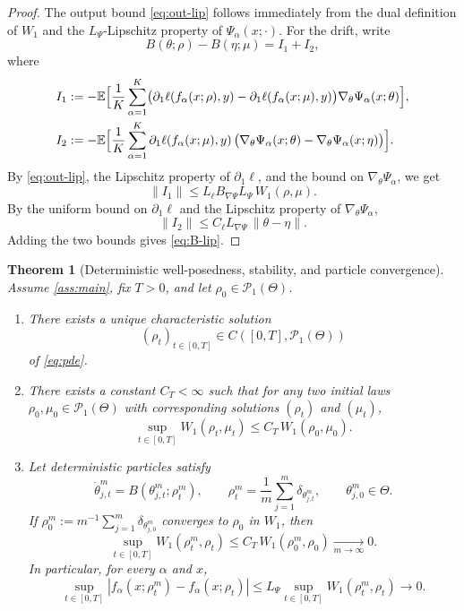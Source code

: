 \documentclass[11pt]{article}
\newtheorem{theorem}{Theorem}[section]
\theoremstyle{definition}
\newcommand{\E}{\mathbb{E}}
\newcommand{\PP}{\mathcal{P}}
\newcommand{\W}{W_1}
\begin{document}
\begin{proof}
The output bound \eqref{eq:out-lip} follows immediately from the dual definition
of $\W$ and the $L_\Psi$-Lipschitz property of $\Psi_\alpha(x;\cdot)$. For the
drift, write
\[
  B(\theta;\rho)-B(\eta;\mu)=I_1+I_2,
\]
where
\begin{align*}
  I_1
  &:=
  -\E\Bigl[
    \frac1K\sum_{\alpha=1}^K
    \bigl(
      \partial_1\ell(f_\alpha(x;\rho),y)-\partial_1\ell(f_\alpha(x;\mu),y)
    \bigr)\nabla_\theta\Psi_\alpha(x;\theta)
  \Bigr],\\
  I_2
  &:=
  -\E\Bigl[
    \frac1K\sum_{\alpha=1}^K
    \partial_1\ell(f_\alpha(x;\mu),y)\,
    \bigl(
      \nabla_\theta\Psi_\alpha(x;\theta)-\nabla_\theta\Psi_\alpha(x;\eta)
    \bigr)
  \Bigr].
\end{align*}
By \eqref{eq:out-lip}, the Lipschitz property of $\partial_1\ell$, and the
bound on $\nabla_\theta\Psi_\alpha$, we get
\[
  \|I_1\|\le L_\ell B_{\nabla\Psi}L_\Psi\,\W(\rho,\mu).
\]
By the uniform bound on $\partial_1\ell$ and the Lipschitz property of
$\nabla_\theta\Psi_\alpha$,
\[
  \|I_2\|\le C_\ell L_{\nabla\Psi}\,\|\theta-\eta\|.
\]
Adding the two bounds gives \eqref{eq:B-lip}.
\end{proof}

\begin{theorem}[Deterministic well-posedness, stability, and particle convergence]
\label{thm:deterministic}
Assume \cref{ass:main}, fix $T>0$, and let $\rho_0\in\PP_1(\Theta)$.

\begin{enumerate}[label=(\roman*),leftmargin=2em]
  \item There exists a unique characteristic solution
  \[
    (\rho_t)_{t\in[0,T]}\in C([0,T],\PP_1(\Theta))
  \]
  of \cref{eq:pde}.
  \item There exists a constant $C_T<\infty$ such that for any two initial laws
  $\rho_0,\mu_0\in\PP_1(\Theta)$ with corresponding solutions $(\rho_t)$ and
  $(\mu_t)$,
  \begin{equation}
    \sup_{t\in[0,T]}\W(\rho_t,\mu_t)
    \le
    C_T\,\W(\rho_0,\mu_0).
    \label{eq:det-stability}
  \end{equation}
  \item Let deterministic particles satisfy
  \[
    \dot\theta_{j,t}^m=B(\theta_{j,t}^m;\rho_t^m),
    \qquad
    \rho_t^m=\frac1m\sum_{j=1}^m\delta_{\theta_{j,t}^m},
    \qquad
    \theta_{j,0}^m\in\Theta.
  \]
  If $\rho_0^m:=m^{-1}\sum_{j=1}^m\delta_{\theta_{j,0}^m}$ converges to $\rho_0$
  in $\W$, then
  \begin{equation}
    \sup_{t\in[0,T]}\W(\rho_t^m,\rho_t)
    \le
    C_T\,\W(\rho_0^m,\rho_0)
    \xrightarrow[m\to\infty]{}0.
    \label{eq:particle-conv}
  \end{equation}
  In particular, for every $\alpha$ and $x$,
  \[
    \sup_{t\in[0,T]}
    |f_\alpha(x;\rho_t^m)-f_\alpha(x;\rho_t)|
    \le
    L_\Psi\sup_{t\in[0,T]}\W(\rho_t^m,\rho_t)
    \to 0.
  \]
\end{enumerate}
\end{theorem}
\end{document}
